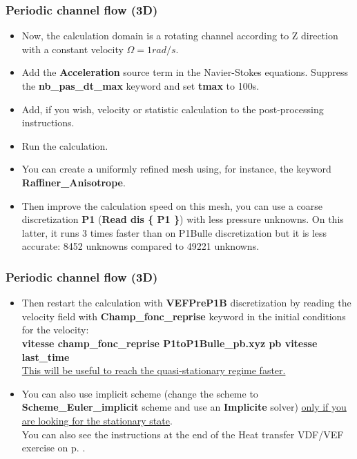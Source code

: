 \documentclass[10pt, hyperref={unicode=true,pdfusetitle, bookmarks=true,bookmarksnumbered=false,bookmarksopen=false, breaklinks=false,pdfborder={0 0l 1},backref=true,colorlinks=true,linkcolor=darkblue,pageanchor}]{beamer}
\begin{document}
\begin{frame}
\frametitle{Periodic channel flow (3D)}
\begin{block}{}

\begin{itemize}
\item Now, the calculation domain is a rotating channel according to Z direction with a constant velocity $\Omega=1 rad/s$. 

\item Add the \textbf{Acceleration} source term in the Navier-Stokes equations. Suppress the \textbf{nb\_pas\_dt\_max} keyword and set \textbf{tmax} to 100s.

\item Add, if you wish, velocity or statistic calculation to the post-processing instructions. 

\item Run the calculation.

\item You can create a uniformly refined mesh using, for instance, the keyword \textbf{Raffiner\_Anisotrope}.

\item Then improve the calculation speed on this mesh, you can use a coarse discretization \textbf{P1} (\textbf{Read dis \{ P1 \}}) with less pressure unknowns. On this latter, it runs 3 times faster than on P1Bulle discretization but it is less accurate: 8452 unknowns compared to 49221 unknowns.
\end{itemize}

\end{block}
\end{frame}
\begin{frame}
\frametitle{Periodic channel flow (3D)}
\begin{block}{}

\begin{itemize}
\item Then restart the calculation with \textbf{VEFPreP1B} discretization by reading the velocity field with \textbf{Champ\_fonc\_reprise} keyword in the initial conditions for the velocity:\\
\textbf{vitesse champ\_fonc\_reprise P1toP1Bulle\_pb.xyz  pb  vitesse  last\_time} \\
\underline{This will be useful to reach the quasi-stationary regime faster.}

\item You can also use implicit scheme (change the scheme to \textbf{Scheme\_Euler\_implicit} scheme and use an \textbf{Implicite} solver) \underline{only if you are looking for the stationary state}.\\ 
You can also see the instructions at the end of the Heat transfer VDF/VEF exercise on p. \pageref{schema_impl}.
\end{itemize}

\end{block}
\end{frame}
\end{document}
